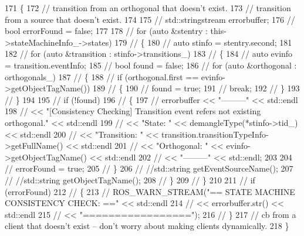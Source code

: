 \begin{DoxyCode}
171 \{
172     \textcolor{comment}{// transition from an orthogonal that doesn’t exist.}
173     \textcolor{comment}{// transition from a source that doesn’t exist.}
174 
175     \textcolor{comment}{// std::stringstream errorbuffer;}
176     \textcolor{comment}{// bool errorFound = false;}
177 
178     \textcolor{comment}{// for (auto &stentry : this->stateMachineInfo\_->states)}
179     \textcolor{comment}{// \{}
180     \textcolor{comment}{//     auto stinfo = stentry.second;}
181 
182     \textcolor{comment}{//     for (auto &transition : stinfo->transitions\_)}
183     \textcolor{comment}{//     \{}
184     \textcolor{comment}{//         auto evinfo = transition.eventInfo;}
185     \textcolor{comment}{//         bool found = false;}
186     \textcolor{comment}{//         for (auto &orthogonal : orthogonals\_)}
187     \textcolor{comment}{//         \{}
188     \textcolor{comment}{//             if (orthogonal.first == evinfo->getObjectTagName())}
189     \textcolor{comment}{//             \{}
190     \textcolor{comment}{//                 found = true;}
191     \textcolor{comment}{//                 break;}
192     \textcolor{comment}{//             \}}
193     \textcolor{comment}{//         \}}
194 
195     \textcolor{comment}{//         if (!found)}
196     \textcolor{comment}{//         \{}
197     \textcolor{comment}{//             errorbuffer << "---------" << std::endl}
198     \textcolor{comment}{//                         << "[Consistency Checking] Transition event refers not existing orthogonal."
       << std::endl}
199     \textcolor{comment}{//                         << "State: " << demangleType(*stinfo->tid\_) << std::endl}
200     \textcolor{comment}{//                         << "Transition: " << transition.transitionTypeInfo->getFullName() <<
       std::endl}
201     \textcolor{comment}{//                         << "Orthogonal: " << evinfo->getObjectTagName() << std::endl}
202     \textcolor{comment}{//                         << "---------" << std::endl;}
203 
204     \textcolor{comment}{//             errorFound = true;}
205     \textcolor{comment}{//         \}}
206     \textcolor{comment}{//         //std::string getEventSourceName();}
207     \textcolor{comment}{//         //std::string getObjectTagName();}
208     \textcolor{comment}{//     \}}
209     \textcolor{comment}{// \}}
210 
211     \textcolor{comment}{// if (errorFound)}
212     \textcolor{comment}{// \{}
213     \textcolor{comment}{//     ROS\_WARN\_STREAM("== STATE MACHINE CONSISTENCY CHECK: ==" << std::endl}
214     \textcolor{comment}{//                                                              << errorbuffer.str() << std::endl}
215     \textcolor{comment}{//                                                              << "=================");}
216     \textcolor{comment}{// \}}
217     \textcolor{comment}{// cb from a client that doesn’t exist – don’t worry about making clients dynamically.}
218 \}
\end{DoxyCode}
